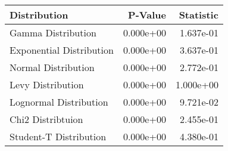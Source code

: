 \begin{tabular}{l rr}
\toprule Distribution &  P-Value & Statistic\\
\midrule
Gamma Distribution & 0.000e+00 & 1.637e-01 \\
Exponential Distribution & 0.000e+00 & 3.637e-01 \\
Normal Distribution & 0.000e+00 & 2.772e-01 \\
Levy Distribution & 0.000e+00 & 1.000e+00 \\
Lognormal Distribution & 0.000e+00 & 9.721e-02 \\
Chi2 Distribtuion & 0.000e+00 & 2.455e-01 \\
Student-T Distribution & 0.000e+00 & 4.380e-01 \\
\bottomrule
\end{tabular}